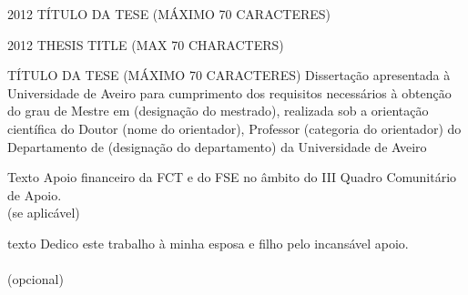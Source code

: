 \documentclass[11pt,twoside,a4paper]{report}
\def\ThesisYear{2012}
\begin{document}
%
%
\TitlePage
   \HEADER{\BAR} %
         {\ThesisYear}
        {TÍTULO DA TESE (MÁXIMO 70 CARACTERES)}
\EndTitlePage
\titlepage\ \endtitlepage %


\TitlePage
         {\ThesisYear}
        { THESIS TITLE (MAX 70 CHARACTERS)}
\EndTitlePage
\titlepage\ \endtitlepage %

%
%
\TitlePage
  \INNERHEADER{}{\ThesisYear}
        {TÍTULO DA TESE (MÁXIMO 70 CARACTERES)}
  \vspace*{25mm}
  \TEXT{}
       {Dissertação apresentada à Universidade de Aveiro para cumprimento dos requisitos necessários à obtenção do grau de Mestre em (designação do mestrado), realizada sob a orientação científica do Doutor (nome do orientador), Professor (categoria do orientador) do Departamento de (designação do departamento) da Universidade de Aveiro}
       
    \vspace{120mm}
    {Texto Apoio financeiro da FCT e do FSE no âmbito do III Quadro Comunitário de Apoio. \\
    (se aplicável)}
   \EndTitlePage

\TitlePage
  \vspace*{55mm}
  \TEXT{}
       {texto Dedico este trabalho à minha esposa e filho pelo incansável apoio.\\
       \\
(opcional)
}
   \EndTitlePage
\end{document}
